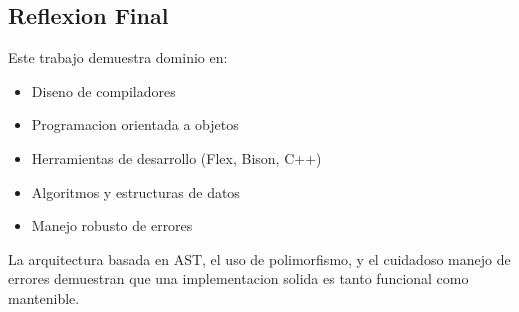 \documentclass[11pt,a4paper]{article}
\begin{document}
\subsection{Reflexion Final}

Este trabajo demuestra dominio en:

\begin{itemize}
    \item Diseno de compiladores
    \item Programacion orientada a objetos
    \item Herramientas de desarrollo (Flex, Bison, C++)
    \item Algoritmos y estructuras de datos
    \item Manejo robusto de errores
\end{itemize}

La arquitectura basada en AST, el uso de polimorfismo, y el cuidadoso manejo de errores demuestran que una implementacion solida es tanto funcional como mantenible.
\end{document}
